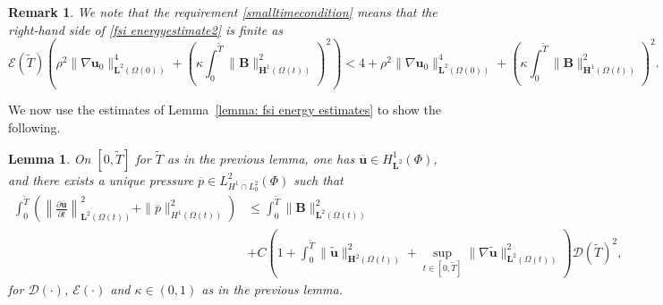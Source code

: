 \documentclass[a4paper]{amsart}
\numberwithin{equation}{section}
\newcommand{\ddt}[1]{\frac{\partial #1}{\partial t}}
\newcommand{\grad}{\nabla}
\theoremstyle{plain}
\newtheorem{lemma}[theorem]{Lemma}
\newtheorem{remark}[theorem]{Remark}
\newcommand{\mbf}[1]{\mathbf{#1}}
\begin{document}
\begin{remark}
    \label{remark: nonzero terms}
    We note that the requirement \eqref{smalltimecondition} means that the right-hand side of \eqref{fsi energyestimate2} is finite as
    \[\mathcal{E}(\widetilde{T})\left(\rho^2 \|\grad \mbf{u}_0\|_{\mbf{L}^2(\Omega(0))}^4 + \left(\kappa \int_0^{\widetilde{T}} \|\mbf{B}\|_{\mbf{H}^1(\Omega(t))}^2\right)^2\right) < 4 + \rho^2 \|\grad \mbf{u}_0\|_{\mbf{L}^2(\Omega(0))}^4 + \left( \kappa\int_0^{\widetilde{T}} \|\mbf{B}\|_{\mbf{H}^1(\Omega(t))}^2\right)^2.\]
\end{remark}

We now use the estimates of Lemma~\ref{lemma: fsi energy estimates} to show the following.

\begin{lemma}
\label{lemma: fsi energy estimates2}
	On $[0,\widetilde{T}]$ for $\widetilde{T}$ as in the previous lemma, one has $\overline{\mbf{u}} \in H^1_{\mbf{L}^2}(\Phi)$, and there exists a unique pressure $\overline{p} \in L^2_{H^1 \cap L^2_0}(\Phi)$ such that
	\begin{equation}
        \begin{aligned}
		\int_{0}^{\widetilde{T}} \left(\left\| \ddt{\overline{\mbf{u}}} \right\|_{\mbf{L}^2(\Omega(t))}^2 + \|\overline{p}\|_{H^1(\Omega(t))}^2\right) &\leq \int_0^{\widetilde{T}} \|\mbf{B}\|_{\mbf{L}^2(\Omega(t))}^2\\
        &+C\left(1 + \int_0^{\widetilde{T}} \|\widetilde{\mbf{u}}\|_{\mbf{H}^2(\Omega(t))}^2 +  \sup_{t \in [0,\widetilde{T}]} \|\grad \widetilde{\mbf{u}}\|_{\mbf{L}^2(\Omega(t))}^2\right) \mathcal{D}(\widetilde{T})^2,
        \end{aligned}
        \label{fsi energyestimate3}
	\end{equation}
	for $\mathcal{D}(\cdot)$, $\mathcal{E}(\cdot)$ and $\kappa \in (0,1)$ as in the previous lemma.
\end{lemma}
\end{document}

